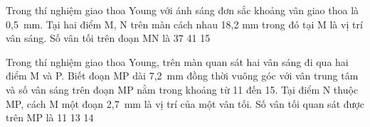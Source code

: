 \begin{vidu}%
Trong thí nghiệm giao thoa Young với ánh sáng đơn sắc khoảng vân giao thoa là 0,5\ mm. Tại hai điểm M, N trên màn cách nhau 18,2 mm trong đó tại M là vị trí vân sáng. Số vân tối trên đoạn MN là
\choice
{}
{37}
{41}
{15}
\end{vidu} 
\begin{vidu}%
Trong thí nghiệm giao thoa Young, trên màn quan sát hai vân sáng đi qua hai điểm M và P. Biết đoạn MP dài 7,2\ mm đồng thời vuông góc với vân trung tâm và số vân sáng trên đoạn MP nằm trong khoảng từ 11 đến 15. Tại điểm N thuộc MP, cách M một đoạn 2,7\ mm là vị trí của một vân tối. Số vân tối quan sát được trên MP là
\choice
{11}
{}
{13}
{14}
\end{vidu} 


